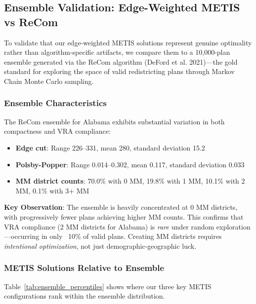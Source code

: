 \subsection{Ensemble Validation: Edge-Weighted METIS vs ReCom}

To validate that our edge-weighted METIS solutions represent genuine optimality rather than algorithm-specific artifacts, we compare them to a 10,000-plan ensemble generated via the ReCom algorithm (DeFord et al. 2021)---the gold standard for exploring the space of valid redistricting plans through Markov Chain Monte Carlo sampling.

\subsubsection{Ensemble Characteristics}

The ReCom ensemble for Alabama exhibits substantial variation in both compactness and VRA compliance:

\begin{itemize}
    \item \textbf{Edge cut}: Range 226--331, mean 280, standard deviation 15.2
    \item \textbf{Polsby-Popper}: Range 0.014--0.302, mean 0.117, standard deviation 0.033
    \item \textbf{MM district counts}: 70.0\% with 0 MM, 19.8\% with 1 MM, 10.1\% with 2 MM, 0.1\% with 3+ MM
\end{itemize}

\textbf{Key Observation}: The ensemble is heavily concentrated at 0 MM districts, with progressively fewer plans achieving higher MM counts. This confirms that VRA compliance (2 MM districts for Alabama) is \emph{rare} under random exploration---occurring in only ~10\% of valid plans. Creating MM districts requires \emph{intentional optimization}, not just demographic-geographic luck.

\subsubsection{METIS Solutions Relative to Ensemble}

Table~\ref{tab:ensemble_percentiles} shows where our three key METIS configurations rank within the ensemble distribution.

